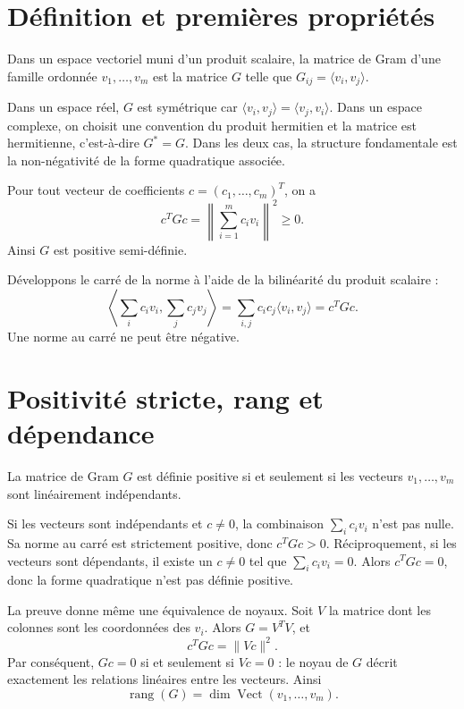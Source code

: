 \section{Définition et premières propriétés}
\begin{definition}
Dans un espace vectoriel muni d'un produit scalaire, la matrice de Gram d'une famille ordonnée $v_1,\ldots,v_m$ est la matrice $G$ telle que $G_{ij}=\langle v_i,v_j\rangle$.
\end{definition}

Dans un espace réel, $G$ est symétrique car $\langle v_i,v_j\rangle=\langle v_j,v_i\rangle$. Dans un espace complexe, on choisit une convention du produit hermitien et la matrice est hermitienne, c'est-à-dire $G^*=G$. Dans les deux cas, la structure fondamentale est la non-négativité de la forme quadratique associée.

\begin{proposition}
Pour tout vecteur de coefficients $c=(c_1,\ldots,c_m)^T$, on a
\[
 c^T Gc=\left\|\sum_{i=1}^m c_i v_i\right\|^2\geq0.
\]
Ainsi $G$ est positive semi-définie.
\end{proposition}

\demonstration Développons le carré de la norme à l'aide de la bilinéarité du produit scalaire :
\[
 \left\langle\sum_i c_iv_i,\sum_j c_jv_j\right\rangle
 =\sum_{i,j}c_ic_j\langle v_i,v_j\rangle=c^TGc.
\]
Une norme au carré ne peut être négative.\finpreuve

\section{Positivité stricte, rang et dépendance}
\begin{theoreme}
La matrice de Gram $G$ est définie positive si et seulement si les vecteurs $v_1,\ldots,v_m$ sont linéairement indépendants.
\end{theoreme}

\demonstration Si les vecteurs sont indépendants et $c\ne0$, la combinaison $\sum_i c_iv_i$ n'est pas nulle. Sa norme au carré est strictement positive, donc $c^TGc>0$. Réciproquement, si les vecteurs sont dépendants, il existe un $c\ne0$ tel que $\sum_i c_iv_i=0$. Alors $c^TGc=0$, donc la forme quadratique n'est pas définie positive.\finpreuve

La preuve donne même une équivalence de noyaux. Soit $V$ la matrice dont les colonnes sont les coordonnées des $v_i$. Alors $G=V^TV$, et
\[
 c^TGc=\|Vc\|^2.
\]
Par conséquent, $Gc=0$ si et seulement si $Vc=0$ : le noyau de $G$ décrit exactement les relations linéaires entre les vecteurs. Ainsi
\[
 \operatorname{rang}(G)=\dim\operatorname{Vect}(v_1,\ldots,v_m).
\]

